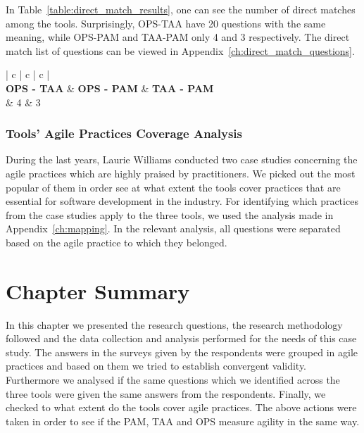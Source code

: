 In Table~\ref{table:direct_match_results}, one can see the number of direct matches among the tools. Surprisingly, \ac{OPS}-\ac{TAA} have 20 questions with the same meaning, while \ac{OPS}-\ac{PAM} and \ac{TAA}-\ac{PAM} only 4 and 3 respectively. The direct match list of questions can be viewed in Appendix~\ref{ch:direct_match_questions}. 

\begin{table} [H]
	\begin{tabular}{{| c | c | c |}}
		\hline
		  \\ \hline
		\textbf{OPS - TAA} & \textbf{OPS - PAM} & \textbf{TAA - PAM} \\  & 4 & 3 \\ \hline
	\end{tabular}
\caption{Direct Match Questions Among Tools - Results}
\label{table:direct_match_results}
\end{table} 


\subsubsection{Tools' Agile Practices Coverage Analysis}
\label{subsubsec:coverage_analysis}
During the last years, Laurie Williams conducted two case studies \cite{Williams_Microsoft, laurie_williams} concerning the agile practices which are highly praised by practitioners. We picked out the most popular of them in order see at what extent the tools cover practices that are essential for software development in the industry. For identifying which practices from the case studies apply to the three tools, we used the analysis made in Appendix~\ref{ch:mapping}. In the relevant analysis, all questions were separated based on the agile practice to which they belonged.

\section{Chapter Summary}
In this chapter we presented the research questions, the research methodology followed and the data collection and analysis performed for the needs of this case study. The answers in the surveys given by the respondents were grouped in agile practices and based on them we tried to establish convergent validity. Furthermore we analysed if the same questions which we identified across the three tools were given the same answers from the respondents. Finally, we checked to what extent do the tools cover agile practices. The above actions were taken in order to see if the \ac{PAM}, \ac{TAA} and \ac{OPS} measure agility in the same way.

